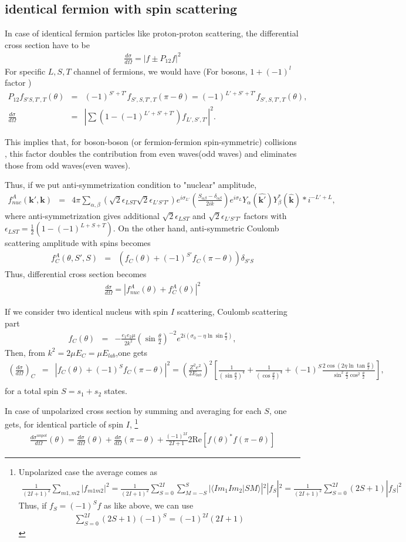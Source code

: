 \documentclass[10pt]{book}
\def\bm{\boldsymbol}
\newcommand{\bea}{\begin{eqnarray}}
\newcommand{\eea}{\end{eqnarray}}
\newcommand{\no}{\nonumber \\}
\def\vk{{\bm k}}
\def\la{\langle}
\def\ra{\rangle}
\begin{document}
\subsection{identical fermion with spin scattering }
In case of identical fermion particles like proton-proton scattering,
the differential cross section have to be 
\bea 
\frac{d\sigma}{d\Omega}=| f\pm P_{12}f |^2
\eea 
For specific $L,S,T$ channel of fermions, we would have (For bosons,
$1+(-1)^l$ factor ) 
\bea 
P_{12}f_{S'S,T',T}(\theta)&=&(-1)^{S'+T'}f_{S',S,T',T}(\pi-\theta)
                           =(-1)^{L'+S'+T'}f_{S',S,T',T}(\theta),\no 
\frac{d\sigma}{d\Omega}
  &=& |\sum (1-(-1)^{L'+S'+T'}) f_{L',S',T'}|^2.
\eea 

This implies that, for boson-boson (or fermion-fermion spin-symmetric)
collisions , this factor doubles the contribution from even waves(odd waves)
and eliminates those from odd waves(even waves). 


Thus, if we put anti-symmetrization condition to "nuclear" amplitude,
\bea 
f^A_{nuc}(\vk',\vk)&=&4\pi\sum_{\alpha,\beta}
       \left(\sqrt{2}\epsilon_{LST} \sqrt{2}\epsilon_{L'S'T'}\right) 
       e^{i\sigma_{L'}}\left(\frac{S_{\alpha\beta}-\delta_{\alpha\beta}}{2ik}\right) e^{i\sigma_{L}}  
       Y_\alpha(\hat{\vk'})Y_\beta^*(\hat{\vk}) *i^{-L'+L}, 
\eea 
where anti-symmetrization gives additional $\sqrt{2}\epsilon_{LST}$
and $\sqrt{2}\epsilon_{L'S'T'}$ factors with $\epsilon_{LST}=\frac{1}{2}(1-(-1)^{L+S+T})$.
On the other hand, anti-symmetric Coulomb scattering amplitude with spins becomes
\bea
f_C^{A}(\theta,S',S)&=&\left(f_C(\theta)+(-1)^{S'}f_C(\pi-\theta)\right)\delta_{S'S}
\eea 
Thus, differential cross section becomes
\bea 
\frac{d\sigma}{d\Omega}=|f^A_{nuc}(\theta)+f^A_C(\theta)|^2
\eea 

If we consider two identical nucleus with spin $I$ scattering,
Coulomb scattering part
\bea 
f_C(\theta)
&=&-\frac{e_1e_2\mu}{2k^2}
 \left(\sin\frac{\theta}{2}\right)^{-2}
 e^{2i(\sigma_0-\eta\ln\sin\frac{\theta}{2})}, 
\eea 
Then, from $k^2=2\mu E_C=\mu E_{lab}$,one gets
\bea 
\left(\frac{d\sigma}{d\Omega}\right)_C
&=&|f_C(\theta)+(-1)^S f_C(\pi-\theta)|^2
=\left( \frac{Z^2 e^2}{2E_{lab}}\right)^2\left[ 
 \frac{1}{(\sin\frac{\theta}{2})^4}+\frac{1}{(\cos\frac{\theta}{2})^4}
          +(-1)^S\frac{2\cos(2\eta\ln\tan\frac{\theta}{2})}{\sin^2\frac{\theta}{2} \cos^2\frac{\theta}{2}}
\right],\no 
\eea 
for a total spin $S=s_1+s_2$ states.

In case of unpolarized cross section by summing and averaging for each $S$, 
one gets, for  identical particle of spin $I$, \footnote{ 
Unpolarized case the average comes as
\bea 
\frac{1}{(2I+1)^2}\sum_{m1,m2} |f_{m1m2}|^2= 
 \frac{1}{(2I+1)^2}\sum_{S=0}^{2I}\sum_{M=-S}^S|\la I m_1 I m_2|S M\ra|^2 |f_{S}|^2
 = \frac{1}{(2I+1)^2}\sum_{S=0}^{2I}(2S+1)|f_{S}|^2  
\eea 
Thus, if $f_S=(-1)^S f $ as like above, we can use
\bea 
\sum_{S=0}^{2I}(2S+1)(-1)^S=(-1)^{2I}(2I+1)
\eea 
}
\bea 
\frac{d\sigma^{unpol}}{d\Omega}(\theta)
=\frac{d\sigma}{d\Omega}(\theta)+\frac{d\sigma}{d\Omega}(\pi-\theta)
 +\frac{(-1)^{2I}}{2I+1}2\mbox{Re}[f(\theta)^* f(\pi-\theta)] 
\eea 
\end{document}
